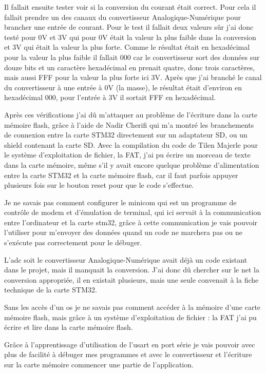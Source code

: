 \documentclass[a4paper]{article}
\begin{document}
Il fallait ensuite tester voir si la conversion du courant était correct. Pour cela il fallait prendre un des canaux du convertisseur Analogique-Numérique pour brancher une entrée de courant. Pour le test il fallait deux valeurs sûr j'ai donc testé pour 0V et 3V qui pour 0V était la valeur la plus faible dans la conversion et 3V qui était la valeur la plus forte. Comme le résultat était en hexadécimal pour la valeur la plus faible il fallait 000 car le convertisseur sort des données sur douze bits et un caractère hexadécimal en prenait quatre, donc trois caractères, mais aussi FFF pour la valeur la plus forte ici 3V. Après que j'ai branché le canal du convertisseur à une entrée à 0V (la masse), le résultat était d'environ en hexadécimal 000, pour l'entrée à 3V il sortait FFF en hexadécimal.

Après ces vérifications j'ai dû m'attaquer au problème de l'écriture dans la carte mémoire flash, grâce à l'aide de Nadir Cherifi qui m'a montré les branchements de connexion entre la carte STM32 directement sur un adaptateur SD, ou un shield contenant la carte SD. Avec la compilation du code de Tilen Majerle pour le système d'exploitation de fichier, la FAT, j'ai pu écrire un morceau de texte dans la carte mémoire, même s'il y avait encore quelque problème d'alimentation entre la carte STM32 et la carte mémoire flash, car il faut parfois appuyer plusieurs fois sur le bouton reset pour que le code s'effectue.

Je ne savais pas comment configurer le minicom qui est un programme de contrôle de modem et d'émulation de terminal, qui ici servait à la communication entre l'ordinateur et la carte stm32, grâce à cette communication je vais pouvoir l'utiliser pour m'envoyer des données quand un code ne marchera pas ou ne s'exécute pas correctement pour le débuger.

L'adc soit le convertisseur Analogique-Numérique avait déjà un code existant dans le projet, mais il manquait la conversion. J'ai donc dû chercher sur le net la conversion appropriée, il en existait plusieurs, mais une seule convenait à la fiche technique de la carte STM32.

Sans les accès d'un os je ne savais pas comment accéder à la mémoire d'une carte mémoire flash, mais grâce à un système d'exploitation de fichier : la FAT j'ai pu écrire et lire dans la carte mémoire flash. 

Grâce à l'apprentissage d'utilisation de l'usart en port série je vais pouvoir avec plus de facilité à débuger mes programmes et avec le convertisseur et l'écriture sur la carte mémoire commencer une partie de l'application.  
\end{document}
